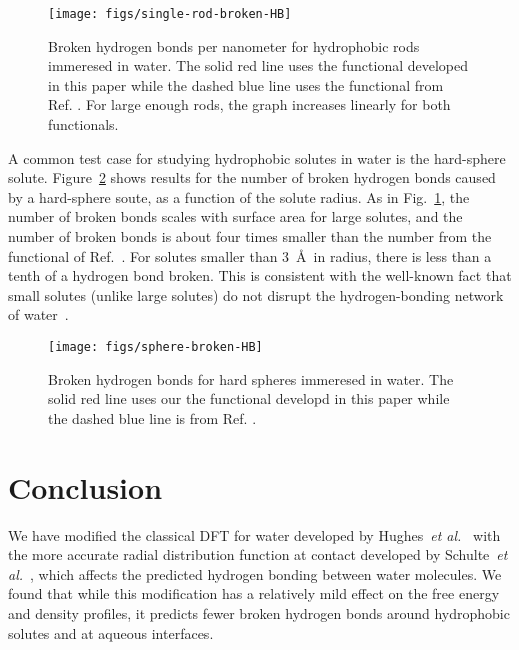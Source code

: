\documentclass[twocolumn,amsmath,amssymb,prl]{revtex4-1}
\begin{document}
\begin{figure}
\begin{center}
\texttt{[image: figs/single-rod-broken-HB]}
\end{center}
\caption{Broken hydrogen bonds per nanometer for hydrophobic rods
  immeresed in water.  The solid red line uses the functional developed
  in this paper while the dashed blue line uses the functional from
  Ref. \cite{hughes2013classical}. For large enough rods, the graph
  increases linearly for both functionals.}
\label{fig:single-rod-broken-HB}
\end{figure}

A common test case for studying hydrophobic solutes in water is the
hard-sphere solute.  Figure~\ref{fig:spheres-broken-HB} shows results
for the number of broken hydrogen bonds caused by a hard-sphere soute,
as a function of the solute radius.  As in
Fig.~\ref{fig:single-rod-broken-HB}, the number of broken bonds scales
with surface area for large solutes, and the number of broken bonds is
about four times smaller than the number from the functional of
Ref.~.  For solutes smaller than
3~\AA\ in radius, there is less than a tenth of a hydrogen bond
broken. This is consistent with the well-known fact that small solutes
(unlike large solutes) do not disrupt the hydrogen-bonding network of
water~\cite{chandler2005}.

\begin{figure}
\begin{center}
\texttt{[image: figs/sphere-broken-HB]}
\end{center}
\caption{Broken hydrogen bonds for hard spheres immeresed in water.
  The solid red line uses our the functional developd in this paper
  while the dashed blue line is from
  Ref. \cite{hughes2013classical}.}
\label{fig:spheres-broken-HB}
\end{figure}

\section{Conclusion}

We have modified the classical DFT for water developed by
Hughes~\emph{et al.}~\cite{hughes2013classical} with the more accurate
radial distribution function at contact developed by Schulte~\emph{et
  al.}~\cite{schulte2012using}, which affects the predicted hydrogen
bonding between water molecules.  We found that while this
modification has a relatively mild effect on the free energy and
density profiles, it predicts fewer broken hydrogen bonds around
hydrophobic solutes and at aqueous interfaces.
\end{document}
